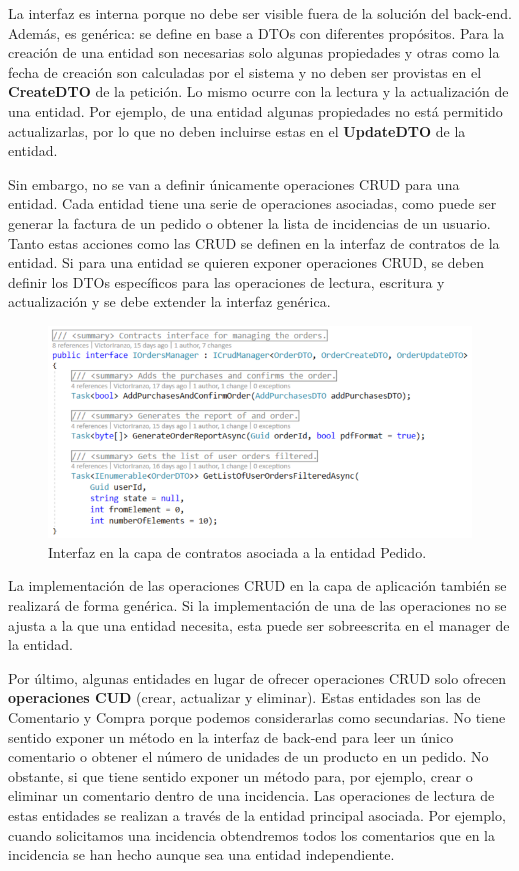 \documentclass[11pt,spanish,listoffigures]{tfgetsinf}
\begin{document}
La interfaz es interna porque no debe ser visible fuera de la solución del back-end. Además, es genérica: se define en base a DTOs con diferentes propósitos. Para la creación de una entidad son necesarias solo algunas propiedades y otras como la fecha de creación son calculadas por el sistema y no deben ser provistas en el \textbf{CreateDTO} de la petición. Lo mismo ocurre con la lectura y la actualización de una entidad. Por ejemplo, de una entidad algunas propiedades no está permitido actualizarlas, por lo que no deben incluirse estas en el \textbf{UpdateDTO} de la entidad. 

Sin embargo, no se van a definir únicamente operaciones CRUD para una entidad. Cada entidad tiene una serie de operaciones asociadas, como puede ser generar la factura de un pedido o obtener la lista de incidencias de un usuario. Tanto estas acciones como las CRUD se definen en la interfaz de contratos de la entidad. Si para una entidad se quieren exponer operaciones CRUD, se deben definir los DTOs específicos para las operaciones de lectura, escritura y actualización y se debe extender la interfaz genérica.

\begin{figure}[h]
\centering
\includegraphics[scale=0.8]{IOrdersManager}
\caption{Interfaz en la capa de contratos asociada a la entidad Pedido.}
\end{figure}

La implementación de las operaciones CRUD en la capa de aplicación también se realizará de forma genérica. Si la implementación de una de las operaciones no se ajusta a la que una entidad necesita, esta puede ser sobreescrita en el manager de la entidad.

Por último, algunas entidades en lugar de ofrecer operaciones CRUD solo ofrecen \textbf{operaciones CUD} (crear, actualizar y eliminar). Estas entidades son las de Comentario y Compra porque podemos considerarlas como secundarias. No tiene sentido exponer un método en la interfaz de back-end para leer un único comentario o obtener el número de unidades de un producto en un pedido. No obstante, si que tiene sentido exponer un método para, por ejemplo, crear o eliminar un comentario dentro de una incidencia. Las operaciones de lectura de estas entidades se realizan a través de la entidad principal asociada. Por ejemplo, cuando solicitamos una incidencia obtendremos todos los comentarios que en la incidencia se han hecho aunque sea una entidad independiente.
\end{document}
